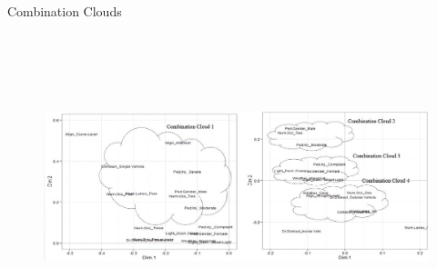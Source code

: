 \documentclass[final]{beamer}
\newlength{\onecolwid}
\newlength{\twocolwid}
\begin{document}
\begin{frame}[t]
\begin{columns}[t]
\begin{column}{\twocolwid}
\begin{columns}[t,totalwidth=\twocolwid]
      \begin{column}{\onecolwid}
        \begin{block}{Combination Clouds}
        \begin{figure}
              \begin{center}
                \includegraphics[width=10in, height=3.5in]{m3.jpg}


\end{center}
\end{figure}
\end{block}
\end{column}
\end{columns}
\end{column}
\end{columns}
\end{frame}
\end{document}
